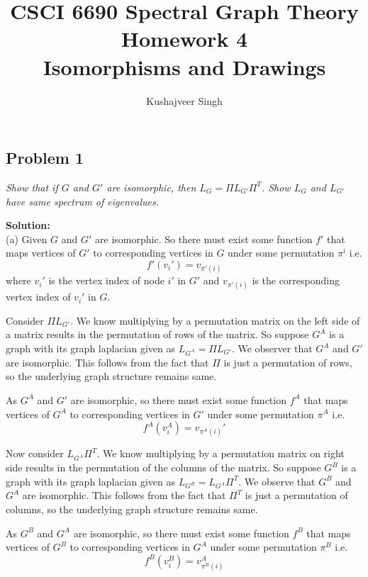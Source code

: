 \documentclass[12pt,a4paper]{article}
\title{CSCI 6690 Spectral Graph Theory Homework 4\\Isomorphisms and Drawings}
\author{Kushajveer Singh}
\date{}
\newcommand{\solution}{\noindent\textbf{Solution:}\\}
\begin{document}
\maketitle

\subsection*{Problem 1}
\textit{
    Show that if $G$ and $G'$ are isomorphic, then $L_G = \Pi L_{G'}\Pi^T$. Show $L_G$ and $L_{G'}$ have same spectrum of eigenvalues.
}

\solution
(a) Given $G$ and $G'$ are isomorphic. So there must exist some function $f'$ that maps vertices of $G'$ to corresponding vertices in $G$ under some permutation $\pi^i$ i.e. 
\begin{equation}
f'(v_i') = v_{\pi'(i)} \label{eq:q_1_1}    
\end{equation}
where $v_i'$ is the vertex index of node $i'$ in $G'$ and $v_{\pi'(i)}$ is the corresponding vertex index of $v_i'$ in $G$.

Consider $\Pi L_{G'}$. We know multiplying by a permutation matrix on the left side of a matrix results in the permutation of rows of the matrix. So suppose $G^A$ is a graph with its graph laplacian given as $L_{G^A} = \Pi L_{G'}$. We observer that $G^A$ and $G'$ are isomorphic. This follows from the fact that $\Pi$ is just a permutation of rows, so the underlying graph structure remains same.

As $G^A$ and $G'$ are isomorphic, so there must exist some function $f^A$ that maps vertices of $G^A$ to corresponding vertices in $G'$ under some permutation $\pi^A$ i.e.
\begin{equation}
f^A(v_i^A) = v_{\pi^A(i)}' \label{eq:q_1_2}
\end{equation}

Now consider $L_{G^A}\Pi ^T$. We know multiplying by a permutation matrix on right side results in the permutation of the columns of the matrix. So suppose $G^B$ is a graph with its graph laplacian given as $L_{G^B} = L_{G^A}\Pi ^T$. We observe that $G^B$ and $G^A$ are isomorphic. This follows from the fact that $\Pi^T$ is just a permutation of columns, so the underlying graph structure remains same.

As $G^B$ and $G^A$ are isomorphic, so there must exist some function $f^B$ that maps vertices of $G^B$ to corresponding vertices in $G^A$ under some permutation $\pi^B$ i.e.
\begin{equation}
f^B(v_i^B) = v_{\pi^B(i)}^A \label{eq:q_1_3}
\end{equation}
\end{document}
